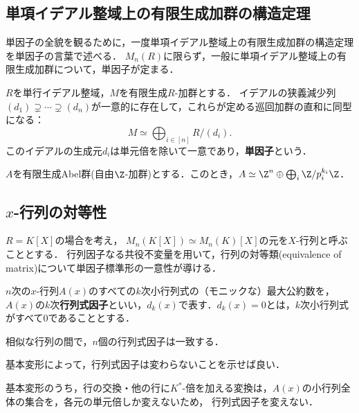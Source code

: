 \documentclass[uplatex, dvipdfmx]{jsreport}
\begin{document}
\subsection{単項イデアル整域上の有限生成加群の構造定理}

\begin{tcolorbox}[colframe=ForestGreen, colback=ForestGreen!10!white,breakable,colbacktitle=ForestGreen!40!white,coltitle=black,fonttitle=\bfseries\sffamily,
title=]
    単因子の全貌を観るために，一度単項イデアル整域上の有限生成加群の構造定理を単因子の言葉で述べる．
    $M_n(R)$に限らず，一般に単項イデアル整域上の有限生成加群について，単因子が定まる．
\end{tcolorbox}

\begin{theorem}
    $R$を単行イデアル整域，$M$を有限生成$R$-加群とする．
    イデアルの狭義減少列$(d_1)\supsetneq\cdots\supsetneq(d_n)$が一意的に存在して，これらが定める巡回加群の直和に同型になる：
    \[M\simeq\bigoplus_{i\in[n]}R/(d_i).\]
    このイデアルの生成元$d_i$は単元倍を除いて一意であり，\textbf{単因子}という．
\end{theorem}

\begin{corollary}
    $A$を有限生成Abel群(自由$\Z$-加群)とする．このとき，$A\simeq\Z^n\oplus\bigoplus_{i}\Z/p_i^{k_i}\Z$．
\end{corollary}

\subsection{$x$-行列の対等性}

\begin{tcolorbox}[colframe=ForestGreen, colback=ForestGreen!10!white,breakable,colbacktitle=ForestGreen!40!white,coltitle=black,fonttitle=\bfseries\sffamily,
title=]
    $R=K[X]$の場合を考え，
    $M_n(K[X])\simeq M_n(K)[X]$の元を$X$-行列と呼ぶこととする．
    行列因子なる共役不変量を用いて，行列の対等類(equivalence of matrix)について単因子標準形の一意性が導ける．
\end{tcolorbox}

\begin{definition}
    $n$次の$x$-行列$A(x)$のすべての$k$次小行列式の（モニックな）最大公約数を，$A(x)$の$k$次\textbf{行列式因子}といい，$d_k(x)$で表す．$d_k(x)=0$とは，$k$次小行列式がすべて$0$であることとする．
\end{definition}
\begin{lemma}[行列式因子は共役不変量である]
    相似な行列の間で，$n$個の行列式因子は一致する．
\end{lemma}
\begin{Proof}
    基本変形によって，行列式因子は変わらないことを示せば良い．

    基本変形のうち，行の交換・他の行に$K^*$-倍を加える変換は，$A(x)$の小行列全体の集合を，各元の単元倍しか変えないため，
    行列式因子を変えない．
\end{Proof}
\end{document}

